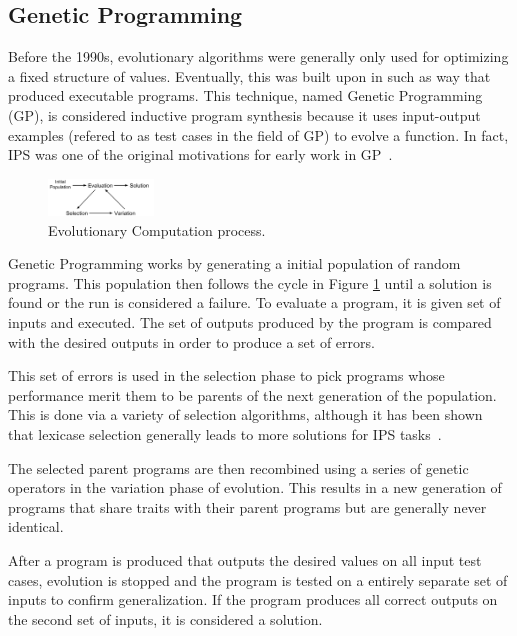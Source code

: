 \subsection{Genetic Programming}

Before the 1990s, evolutionary algorithms were generally only used for optimizing a fixed structure of values. Eventually, this was built upon in such as way that produced executable programs. This technique, named Genetic Programming (GP), is considered inductive program synthesis because it uses input-output examples (refered to as test cases in the field of GP) to evolve a function. In fact, IPS was one of the original motivations for early work in GP~\cite{Koza1992}.

\begin{figure}[t]
\centering
\includegraphics[width=0.25\textwidth]{res/EvolutionCycle}
\caption{Evolutionary Computation process.}
\label{fig:evo}
\end{figure}

Genetic Programming works by generating a initial population of random programs.  This population then follows the cycle in Figure \ref{fig:evo} until a solution is found or the run is considered a failure. To evaluate a program, it is given set of inputs and executed. The set of outputs produced by the program is compared with the desired outputs in order to produce a set of errors. 

This set of errors is used in the selection phase to pick programs whose performance merit them to be parents of the next generation of the population. This is done via a variety of selection algorithms, although it has been shown that lexicase selection generally leads to more solutions for IPS tasks~\cite{Helmuth2015a, Helmuth2015c, Forstenlechner:2017:eurogp}.

The selected parent programs are then recombined using a series of genetic operators in the variation phase of evolution. This results in a new generation of programs that share traits with their parent programs but are generally never identical.

After a program is produced that outputs the desired values on all input test cases, evolution is stopped and the program is tested on a entirely separate set of inputs to confirm generalization. If the program produces all correct outputs on the second set of inputs, it is considered a solution.

